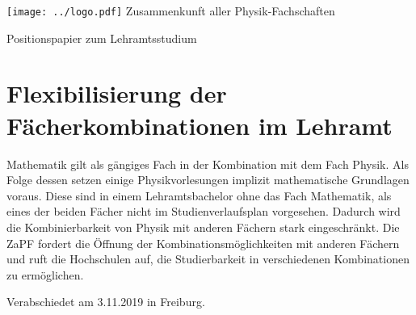 \documentclass[DIV=calc]{scrartcl}
\begin{document}
	\hspace{0.87\textwidth}
	\begin{minipage}{120pt}
		\vspace{-1.8cm}
		\texttt{[image: ../logo.pdf]}
		\centering
		\small Zusammenkunft aller Physik-Fachschaften
	\end{minipage}
	\begin{center}
		\huge{Positionspapier zum Lehramtsstudium}\vspace{.25\baselineskip}\\
		\normalsize
	\end{center}
	\vspace{1cm}


	\section*{Flexibilisierung der Fächerkombinationen im Lehramt}


	Mathematik gilt als gängiges Fach in der Kombination mit dem Fach Physik.
	Als Folge dessen setzen einige Physikvorlesungen implizit mathematische Grundlagen voraus.
	Diese sind in einem Lehramtsbachelor ohne das Fach Mathematik, als eines der beiden Fächer nicht im Studienverlaufsplan vorgesehen.
	Dadurch wird die Kombinierbarkeit von Physik mit anderen Fächern stark eingeschränkt.
	Die ZaPF fordert die Öffnung der Kombinationsmöglichkeiten mit anderen Fächern und ruft die Hochschulen auf, die Studierbarkeit in verschiedenen Kombinationen zu ermöglichen.
	\newline
	\\


\vfill
\begin{flushright}
	Verabschiedet am 3.11.2019 in Freiburg.
\end{flushright}
\end{document}
